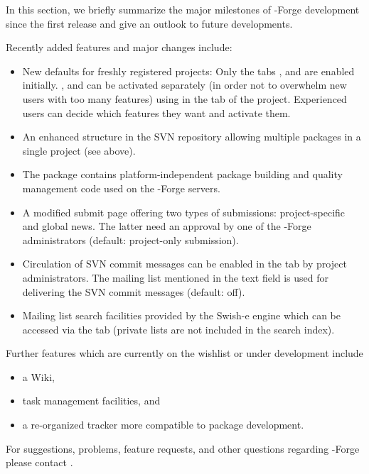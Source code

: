In this section, we briefly summarize the major milestones of
\R{}-Forge development since the first release and give an outlook to
future developments.

Recently added features and major changes include:

\begin{itemize}
\item New defaults for freshly registered projects: Only the tabs
  ,  and  are enabled
  initially. ,  and 
  can be activated separately (in order not to overwhelm
  new users with too many features) using  in
  the  tab of the project. Experienced users can decide
  which features they want and activate them.
\item An enhanced structure in the SVN repository allowing multiple
  packages in a single project (see above).
\item The \R{} package  \citep{forge:theussl:2008}
  contains platform-independent package
  building and quality management code used on the \R{}-Forge servers.
\item A modified  submit page offering two types of
  submissions: project-specific and global news. The latter
  need an approval by one of the \R{}-Forge administrators (default:
  project-only submission).
\item Circulation of SVN commit messages can be enabled in the
   tab by project administrators. The mailing list mentioned in
  the text field is used for delivering the SVN commit messages
  (default: off). 
\item Mailing list search facilities provided by the Swish-e engine
  which can be accessed via the  tab (private lists
  are not included in the search index).

\end{itemize}

Further features which are currently on the wishlist or under
development include 

\begin{itemize}
\item a Wiki,
\item task management facilities, and
\item a re-organized tracker more compatible to \R{} package development. 
\end{itemize}

For suggestions, problems, feature requests, and other questions regarding
\R{}-Forge please contact .

